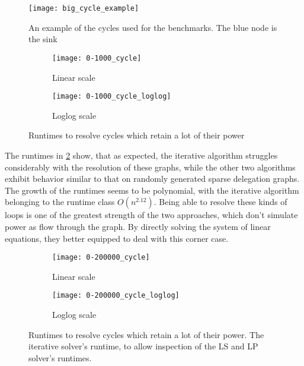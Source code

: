 \begin{figure}[t]
	\centering
	\texttt{[image: big\_cycle\_example]}
	\caption{An example of the cycles used for the benchmarks. The blue node is the sink}
	\label{fig:big_cycle_example}
\end{figure}

\begin{figure}[t]
    \centering
    \begin{subfigure}[t]{0.45\textwidth}
    	\centering
    	\texttt{[image: 0-1000\_cycle]}
    	\caption{Linear scale}
    	\label{subfig:cycle-small-linear}
    \end{subfigure}
    \hfill
    \begin{subfigure}[t]{0.45\textwidth}
        \centering
        \texttt{[image: 0-1000\_cycle\_loglog]}
        \caption{Loglog scale}
         \label{subfig:cycle-small-loglog}
    \end{subfigure}
    \caption{Runtimes to resolve cycles which retain a lot of their power}
    \label{fig:cycle_small}
\end{figure}

The runtimes in \cref{subfig:cycle-small-linear} show, that as expected, the iterative algorithm struggles considerably with the resolution of these graphs, while the other two algorithms exhibit behavior similar to that on randomly generated sparse delegation graphs. The growth of the runtimes seems to be polynomial, with the iterative algorithm belonging to the runtime class $O(n^{2.12})$. Being able to resolve these kinds of loops is one of the greatest strength of the two approaches, which don't simulate power as flow through the graph. By directly solving the system of linear equations, they better equipped to deal with this corner case.  

\begin{figure}[t]
    \centering
    \begin{subfigure}[t]{0.45\textwidth}
    	\centering
    	\texttt{[image: 0-200000\_cycle]}
    	\caption{Linear scale}
    	\label{subfig:cycle-large-linear}
    \end{subfigure}
    \hfill
    \begin{subfigure}[t]{0.45\textwidth}
        \centering
        \texttt{[image: 0-200000\_cycle\_loglog]}
        \caption{Loglog scale}
         \label{subfig:cycle-large-loglog}
    \end{subfigure}
    \caption{Runtimes to resolve cycles which retain a lot of their power. The iterative solver's runtime, to allow inspection of the LS and LP solver's runtimes.}
    \label{fig:cycle_large}
\end{figure}

